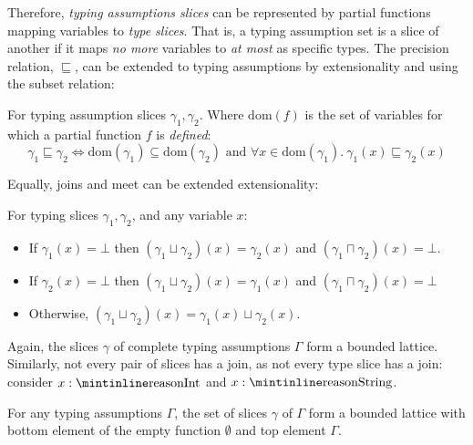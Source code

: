 Therefore, \textit{typing assumptions slices} can be represented by partial functions mapping variables to \textit{type slices}. That is, a typing assumption set is a slice of another if it maps \textit{no more} variables to \textit{at most} as specific types. The precision relation, $\sqsubseteq$, can be extended to typing assumptions by extensionality \cite{Extensionality} and using the subset relation:

\begin{definition}
For typing assumption slices $\gamma_1, \gamma_2$. Where $\mathrm{dom}(f)$ is the set of variables for which a partial function $f$ is \textit{defined}:
\[\gamma_1 \sqsubseteq \gamma_2 \iff \mathrm{dom}(\gamma_1) \subseteq \mathrm{dom}(\gamma_2) \text{ and } \forall x \in  \mathrm{dom}(\gamma_1).\ \gamma_1(x) \sqsubseteq \gamma_2(x)\]
\end{definition}
Equally, joins and meet can be extended extensionality:
\begin{definition}
For typing slices $\gamma_1, \gamma_2$, and any variable $x$:


\begin{minipage}{0.8\textwidth}
\begin{itemize}
\item If $\gamma_1(x) = \bot$ then $(\gamma_1 \sqcup \gamma_2)(x) = \gamma_2(x)$ and $(\gamma_1 \sqcap \gamma_2)(x) = \bot$. 
\item If $\gamma_2(x) = \bot$ then $(\gamma_1 \sqcup \gamma_2)(x) = \gamma_1(x)$ and $(\gamma_1 \sqcap \gamma_2)(x) = \bot$
\item Otherwise, $(\gamma_1 \sqcup \gamma_2)(x) = \gamma_1(x) \sqcup \gamma_2(x)$.
\end{itemize}
\end{minipage}
\end{definition}
Again, the slices $\gamma$ of complete typing assumptions $\Gamma$ form a bounded lattice. Similarly, not every pair of slices has a join, as not every type slice has a join: consider $x : \code{Int}$ and $x : \code{String}$.

\begin{proposition}
For any typing assumptions $\Gamma$, the set of slices $\gamma$ of $\Gamma$ form a bounded lattice with bottom element of the empty function $\emptyset$ and top element $\Gamma$.
\end{proposition}
